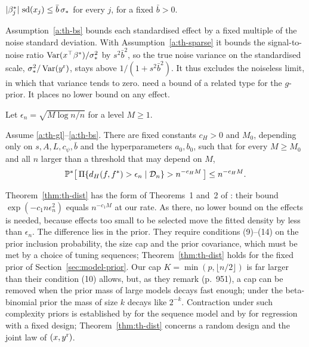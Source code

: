 \begin{assumption}\label{a:th-bs}
$\lvert \beta^*_j\rvert\,\operatorname{sd}(x_j)\le\bar b\,\sigma_*$ for every $j$, for a fixed $\bar b>0$.
\end{assumption}

Assumption~\ref{a:th-bs} bounds each standardised effect by a fixed multiple of the noise standard deviation. With
Assumption~\ref{a:th-sparse} it bounds the signal-to-noise ratio $\operatorname{Var}(x^\top\beta^*)/\sigma_*^2$ by $s^2\bar b^2$, so
the true noise variance on the standardised scale, $\sigma_*^2/\operatorname{Var}(y^{\mathrm r})$, stays above $1/(1+s^2\bar b^2)$. It thus excludes
the noiseless limit, in which that variance tends to zero. \citet{YangWainwrightJordan2016} need a bound of a related
type for the $g$-prior. It places no lower bound on any effect.

Let $\epsilon_n=\sqrt{M\log n/n}$ for a level $M\ge1$.

\begin{theorem}\label{thm:th-dist}
Assume \ref{a:th-gl}--\ref{a:th-bs}. There are fixed constants $c_H>0$ and $M_0$, depending only on
$s,A,L,c_\psi,\bar b$ and the hyperparameters $a_0,b_0$, such that for every $M\ge M_0$ and all $n$ larger than a
threshold that may depend on $M$,
\[
  \mathbb{P}^*\big[\,\Pi\{d_H(f,f^*)>\epsilon_n\mid\mathcal D_n\}>n^{-c_HM}\,\big]\le n^{-c_HM}.
\]
\end{theorem}

Theorem~\ref{thm:th-dist} has the form of Theorems~1 and~2 of \citet{SongLiang2015}: their bound
$\exp(-c_1n\epsilon_n^2)$ equals $n^{-c_1M}$ at our rate. As there, no lower bound on the effects is needed, because
effects too small to be selected move the fitted density by less than $\epsilon_n$. The difference lies in the prior.
They require conditions (9)--(14) on the prior inclusion probability, the size cap and the prior
covariance, which must be met by a choice of tuning sequences; Theorem~\ref{thm:th-dist} holds for the fixed prior of
Section~\ref{sec:model-prior}. Our cap $K=\min(p,\lfloor n/2\rfloor)$ is far larger than their condition (10) allows,
but, as they remark (p.~951), a cap can be removed when the prior mass of large models decays fast enough; under the
beta-binomial prior the mass of size $k$ decays like $2^{-k}$. Contraction under such complexity priors is established
by \citet{CastilloVanDerVaart2012} for the sequence model and by \citet{CastilloSchmidtHieberVanDerVaart2015} for
regression with a fixed design; Theorem~\ref{thm:th-dist} concerns a random design and the joint law of $(x,y^{\mathrm r})$.

